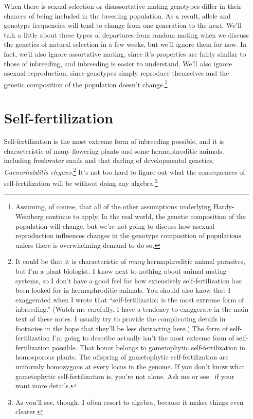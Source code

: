When there is sexual selection or disassortative mating genotypes
differ in their chances of being included in the breeding
population. As a result, allele and genotype frequencies will tend to
change from one generation to the next. We'll talk a little about
these types of departures from random mating when we discuss the
genetics of natural selection in a few weeks, but we'll ignore them
for now. In fact, we'll also ignore assortative mating, since it's
properties are fairly similar to those of inbreeding, and inbreeding
is easier to understand. We'll also ignore asexual reproduction, since
genotypes simply reproduce themselves and the genetic composition of
the population doesn't change.\footnote{Assuming, of course, that all
  of the other assumptions underlying Hardy-Weinberg continue to
  apply. In the real world, the genetic composition of the population
  will change, but we're not going to discuss how asexual reproduction
  influences changes in the genotype composition of populations unless
  there is overwhelming demand to do so.}

\section*{Self-fertilization}

Self-fertilization is the most extreme form of inbreeding
possible,
and it is characteristic of many flowering plants and some
hermaphroditic animals, including freshwater snails and that darling
of developmental genetics, {\it Caenorhabditis elegans}.\footnote{It
  could be that it is characteristic of {\it many\/} hermaphroditic
  animal parasites, but I'm a plant biologist. I know next to nothing
  about animal mating systems, so I don't have a good feel for how
  extensively self-fertilization has been looked for in hermaphroditic
  animals. You should also know that I exaggerated when I wrote that
  ``self-fertilization is the most extreme form of inbreeding.''
  (Watch me carefully. I have a tendency to exaggerate in the main
  text of these notes. I usually try to provide the complicating
  details in footnotes in the hope that they'll be less distracting
  here.) The form of self-fertilization I'm going to describe actually
  isn't the most extreme form of self-fertilization possible. That
  honor belongs to gametophytic self-fertilization in homosporous
  plants. The offspring of gametophytic self-fertilization are
  uniformly homozygous at every locus in the genome. If you don't know
  what gametophytic self-fertilization is, you're not alone. Ask me or
  see~\cite{Holsinger-1990} if your want more details.} It's not too
hard to figure out what the consequences of self-fertilization will be
without doing any algebra.\footnote{As you'll see, though, I often
  resort to algebra, because it makes things even clearer.}

